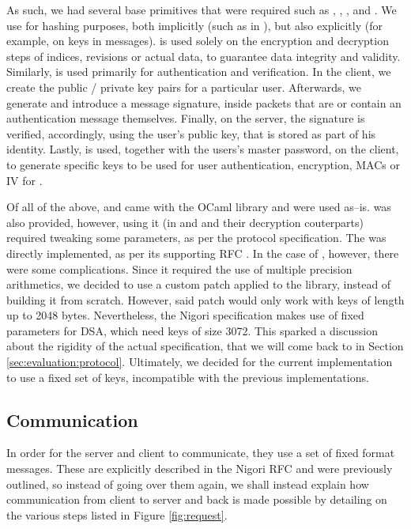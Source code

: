 As such, we had several base primitives that were required such as , , ,  and .
We use  for hashing purposes, both implicitly (such as in ), but also explicitly (for example, on  keys in messages).
 is used solely on the encryption and decryption steps of indices, revisions or actual data, to guarantee data integrity and validity.
Similarly,  is used primarily for authentication and verification.
In the client, we create the public / private key pairs for a particular user.
Afterwards, we generate and introduce a message signature, inside packets that are or contain an authentication message themselves.
Finally, on the server, the signature is verified, accordingly, using the user's public key, that is stored as part of his identity.
Lastly,  is used, together with the users's master password, on the client, to generate specific keys to be used for user authentication, encryption, MACs or IV for .

Of all of the above,  and  came with the OCaml  library and were used as--is.
 was also provided, however, using it (in  and  and their decryption couterparts) required tweaking some parameters, as per the protocol specification.
The  was directly implemented, as per its supporting RFC \cite{RFC2898}.
In the case of , however, there were some complications.
Since it required the use of multiple precision arithmetics, we decided to use a custom patch applied to the  library, instead of building it from scratch.
However, said patch would only work with keys of length up to 2048 bytes.
Nevertheless, the Nigori specification makes use of fixed parameters for DSA, which need keys of size 3072.
This sparked a discussion about the rigidity of the actual specification, that we will come back to in Section \ref{sec:evaluation:protocol}.
Ultimately, we decided for the current implementation to use a fixed set of keys, incompatible with the previous implementations.

\subsection{Communication}
In order for the server and client to communicate, they use a set of fixed format messages.
These are explicitly described in the Nigori RFC and were previously outlined, so instead of going over them again, we shall instead explain how communication from client to server and back is made possible by detailing on the various steps listed in Figure \ref{fig:request}.

